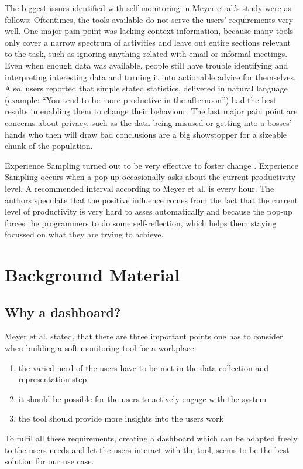 \documentclass{seal_article}
\begin{document}
The biggest issues identified with self-monitoring in Meyer et al.'s study \cite{Meyer:2017:DRS:3171581.3134714} were as follows: Oftentimes, the tools available do not serve the users’ requirements very well. One major pain point was lacking context information, because many tools only cover a narrow spectrum of activities and leave out entire sections relevant to the task, such as ignoring anything related with email or informal meetings. Even when enough data was available, people still have trouble identifying and interpreting interesting data and turning it into actionable advice for themselves. Also, users reported that simple stated statistics, delivered in natural language (example: “You tend to be more productive in the afternoon”) had the best results in enabling them to change their behaviour. The last major pain point are concerns about privacy, such as the data being misused or getting into a bosses’ hands who then will draw bad conclusions are a big showstopper for a sizeable chunk of the population.

Experience Sampling turned out to be very effective to foster change \cite{Meyer:2017:DRS:3171581.3134714}. Experience Sampling occurs when a pop-up occasionally asks about the current productivity level. A recommended interval according to Meyer et al. \cite{Meyer:2017:DRS:3171581.3134714} is every hour. The authors speculate that the positive influence comes from the fact that the current level of productivity is very hard to asses automatically and because the pop-up forces the programmers to do some self-reflection, which helps them staying focussed on what they are trying to achieve.


\section{Background Material}

\subsection{Why a dashboard?}
Meyer et al. \cite{Meyer:2017:DRS:3171581.3134714} stated, that there are three important points one has to consider when building a soft-monitoring tool for a workplace: 
\begin{enumerate}
	\item the varied need of the users have to be met in the data collection and representation step
	\item it should be possible for the users to actively engage with the system
	\item the tool should provide more insights into the users work
\end{enumerate}
To fulfil all these requirements, creating a dashboard which can be adapted freely to the users needs and let the users interact with the tool, seems to be the best solution for our use case. 
\end{document}
